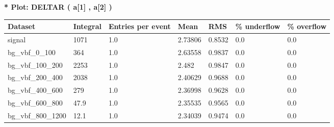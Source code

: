 \documentclass[a4paper, 10pt]{article}
\begin{document}
\textbf{* Plot: DELTAR ( a[1] , a[2] ) }\\
   \begin{table}[H]
  \begin{center}
    \begin{tabular}{|m{23.0mm}|m{23.0mm}|m{18.0mm}|m{19.0mm}|m{19.0mm}|m{19.0mm}|m{19.0mm}|}
      \hline
      {\cellcolor{yellow}         Dataset}& {\cellcolor{yellow}         Integral}& {\cellcolor{yellow}         Entries per event}& {\cellcolor{yellow}         Mean}& {\cellcolor{yellow}         RMS}& {\cellcolor{yellow}         \% underflow}& {\cellcolor{yellow}         \% overflow}\\
      \hline
      {\cellcolor{white}         signal}& {\cellcolor{white}         1071}& {\cellcolor{white}         1.0}& {\cellcolor{white}         2.73806}& {\cellcolor{white}         0.8532}& {\cellcolor{green}         0.0}& {\cellcolor{green}         0.0}\\
      \hline
      {\cellcolor{white}         bg\_vbf\_0\_100}& {\cellcolor{white}         364}& {\cellcolor{white}         1.0}& {\cellcolor{white}         2.63558}& {\cellcolor{white}         0.9837}& {\cellcolor{green}         0.0}& {\cellcolor{green}         0.0}\\
      \hline
      {\cellcolor{white}         bg\_vbf\_100\_200}& {\cellcolor{white}         2253}& {\cellcolor{white}         1.0}& {\cellcolor{white}         2.482}& {\cellcolor{white}         0.9847}& {\cellcolor{green}         0.0}& {\cellcolor{green}         0.0}\\
      \hline
      {\cellcolor{white}         bg\_vbf\_200\_400}& {\cellcolor{white}         2038}& {\cellcolor{white}         1.0}& {\cellcolor{white}         2.40629}& {\cellcolor{white}         0.9688}& {\cellcolor{green}         0.0}& {\cellcolor{green}         0.0}\\
      \hline
      {\cellcolor{white}         bg\_vbf\_400\_600}& {\cellcolor{white}         279}& {\cellcolor{white}         1.0}& {\cellcolor{white}         2.36998}& {\cellcolor{white}         0.9628}& {\cellcolor{green}         0.0}& {\cellcolor{green}         0.0}\\
      \hline
      {\cellcolor{white}         bg\_vbf\_600\_800}& {\cellcolor{white}         47.9}& {\cellcolor{white}         1.0}& {\cellcolor{white}         2.35535}& {\cellcolor{white}         0.9565}& {\cellcolor{green}         0.0}& {\cellcolor{green}         0.0}\\
      \hline
      {\cellcolor{white}         bg\_vbf\_800\_1200}& {\cellcolor{white}         12.1}& {\cellcolor{white}         1.0}& {\cellcolor{white}         2.34039}& {\cellcolor{white}         0.9474}& {\cellcolor{green}         0.0}& {\cellcolor{green}         0.0}\\

\end{tabular}
\end{center}
\end{table}
\end{document}
